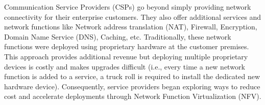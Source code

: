Communication Service Providers (CSPs) go beyond simply providing network connectivity for their enterprise customers. They also offer additional services and network functions like Network address translation (NAT), Firewall, Encryption, Domain Name Service
(DNS), Caching, etc. Traditionally, these network functions were deployed using proprietary hardware at the customer premises. This approach provides additional revenue but
deploying multiple proprietary devices is costly and makes upgrades difficult (i.e., every
time a new network function is added to a service, a truck roll is required to install the
dedicated new hardware device). Consequently, service providers began exploring ways to
reduce cost and accelerate deployments through Network Function Virtualization (NFV).